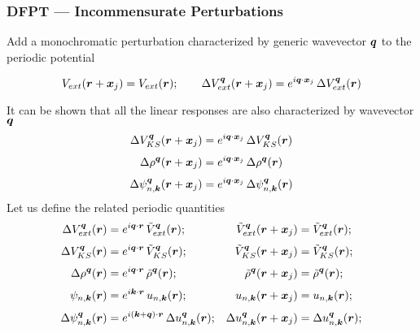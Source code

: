 \begin{frame}[allowframebreaks]
  \frametitle{DFPT --- Incommensurate Perturbations}

  Add a monochromatic perturbation characterized by generic wavevector $\boldsymbol{q}$ to the periodic potential

  \begin{equation*}
    V_{ext}(\boldsymbol{r} + \boldsymbol{x}_j)
    =
    V_{ext}(\boldsymbol{r})
    ;
    \qquad
    \Delta V_{ext}^{\boldsymbol{q}}(\boldsymbol{r} + \boldsymbol{x}_j)
    =
    e^{i\boldsymbol{q}\cdot\boldsymbol{x}_j}\,
    \Delta V_{ext}^{\boldsymbol{q}}(\boldsymbol{r})
  \end{equation*}

  It can be shown that all the linear responses are also characterized by wavevector $\boldsymbol{q}$
  \begin{align*}
    \Delta V_{KS}^{\boldsymbol{q}}(\boldsymbol{r} + \boldsymbol{x}_j) &= e^{i\boldsymbol{q}\cdot\boldsymbol{x}_j}\,
                                                  \Delta V_{KS}^{\boldsymbol{q}}(\boldsymbol{r}) \\[3pt]
    \Delta\rho^{\boldsymbol{q}}(\boldsymbol{r} + \boldsymbol{x}_j) &= e^{i\boldsymbol{q}\cdot\boldsymbol{x}_j}\,
                                                \Delta\rho^{\boldsymbol{q}}(\boldsymbol{r}) \\[3pt]
    \Delta \psi_{n,\boldsymbol{k}}^{\boldsymbol{q}}(\boldsymbol{r} + \boldsymbol{x}_j) &=
                                                     e^{i\boldsymbol{q}\cdot\boldsymbol{x}_j}\,
                                                     \Delta \psi_{n,\boldsymbol{k}}^{\boldsymbol{q}}(\boldsymbol{r})
  \end{align*}
  Let us define the related periodic quantities
  \begin{align*}
    \Delta V_{ext}^{\boldsymbol{q}}(\boldsymbol{r}) &= e^{i\boldsymbol{q}\cdot\boldsymbol{r}}\, {\tilde V}_{ext}^{\boldsymbol{q}}(\boldsymbol{r});
    &
     {\tilde V}_{ext}^{\boldsymbol{q}}(\boldsymbol{r} + \boldsymbol{x}_j) &= 
     {\tilde V}_{ext}^{\boldsymbol{q}}(\boldsymbol{r});
    \\[3pt]
    \Delta V_{KS}^{\boldsymbol{q}}(\boldsymbol{r}) &= e^{i\boldsymbol{q}\cdot\boldsymbol{r}}\, {\tilde V}_{KS}^{\boldsymbol{q}}(\boldsymbol{r});
    &
     {\tilde V}_{KS}^{\boldsymbol{q}}(\boldsymbol{r} + \boldsymbol{x}_j) &= 
     {\tilde V}_{KS}^{\boldsymbol{q}}(\boldsymbol{r});
    \\[3pt]
    \Delta\rho^{\boldsymbol{q}}(\boldsymbol{r}) &= e^{i\boldsymbol{q}\cdot\boldsymbol{r}}\, {\tilde\rho}^{\boldsymbol{q}}(\boldsymbol{r});
    &
     {\tilde \rho}^{\boldsymbol{q}}(\boldsymbol{r} + \boldsymbol{x}_j) &= 
     {\tilde \rho}^{\boldsymbol{q}}(\boldsymbol{r});
    \\[3pt]
    \psi_{n,\boldsymbol{k}}(\boldsymbol{r}) &= e^{i\boldsymbol{k}\cdot\boldsymbol{r}}\, u_{n,\boldsymbol{k}}(\boldsymbol{r});
    &
     u_{n,\boldsymbol{k}}(\boldsymbol{r} + \boldsymbol{x}_j) &= 
     u_{n,\boldsymbol{k}}(\boldsymbol{r}); \\[3pt]
    \Delta \psi_{n,\boldsymbol{k}}^{\boldsymbol{q}}(\boldsymbol{r}) &= e^{i(\boldsymbol{k} + \boldsymbol{q})\cdot\boldsymbol{r}}\, \Delta u_{n,\boldsymbol{k}}^{\boldsymbol{q}}(\boldsymbol{r});
    &
     \Delta u_{n,\boldsymbol{k}}^{\boldsymbol{q}}(\boldsymbol{r} + \boldsymbol{x}_j) &= 
     \Delta u_{n,\boldsymbol{k}}^{\boldsymbol{q}}(\boldsymbol{r});
  \end{align*}


\end{frame}
